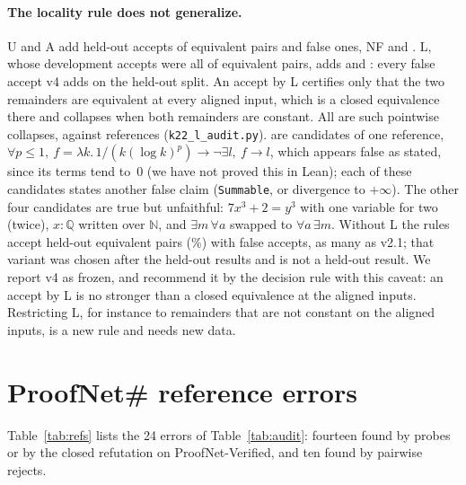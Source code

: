 \documentclass[10pt]{article}
\theoremstyle{definition}
\begin{document}
\paragraph{The locality rule does not generalize.} U and A add \VfValidPubStepUAF{} held-out
accepts of equivalent pairs and \VfValidPubStepUAU{} false ones, NF \VfValidPubStepNFF{} and
\VfValidPubStepNFU{}. L, whose \VfTestPubLAdd{} development accepts were all of equivalent pairs,
adds \VfValidPubLAddF{} and \VfValidPubLAddU{}: every false accept v4 adds on the held-out split. An
accept by L certifies only that the two remainders are equivalent at every aligned input, which is
a closed equivalence there and collapses when both remainders are constant. All
\VfValidPubLAddU{} are such pointwise collapses, against \VfValidPubLFARefs{} references
(\texttt{k22\_l\_audit.py}). \VfValidPubLFATop{} are candidates of one reference,
$\forall p\le 1,\ f=\lambda k.\,1/(k(\log k)^p)\to\neg\exists l,\ f\to l$, which appears false as
stated, since its terms tend to~$0$ (we have not proved this in Lean); each of these candidates
states another false claim (\texttt{Summable}, or divergence to $+\infty$). The other four
candidates are true but unfaithful: $7x^3+2=y^3$ with one variable for two (twice), $x:\mathbb Q$
written over $\mathbb N$, and $\exists m\,\forall a$ swapped to $\forall a\,\exists m$. Without L
the rules accept \VfValidPubUANFAcc{} held-out equivalent pairs (\VfValidPubUANFAccPct\%) with
\VfValidPubUANFFA{} false accepts, as many as v2.1; that variant was chosen after the held-out
results and is not a held-out result. We report v4 as frozen, and recommend it by the decision
rule with this caveat: an accept by L is no stronger than a closed equivalence at the aligned
inputs. Restricting L, for instance to remainders that are not constant on the aligned inputs, is
a new rule and needs new data.

\section{ProofNet\# reference errors}\label{app:refs}

Table~\ref{tab:refs} lists the 24 errors of Table~\ref{tab:audit}: fourteen found by probes or by
the closed refutation on ProofNet-Verified, and ten found by pairwise rejects.
\end{document}
